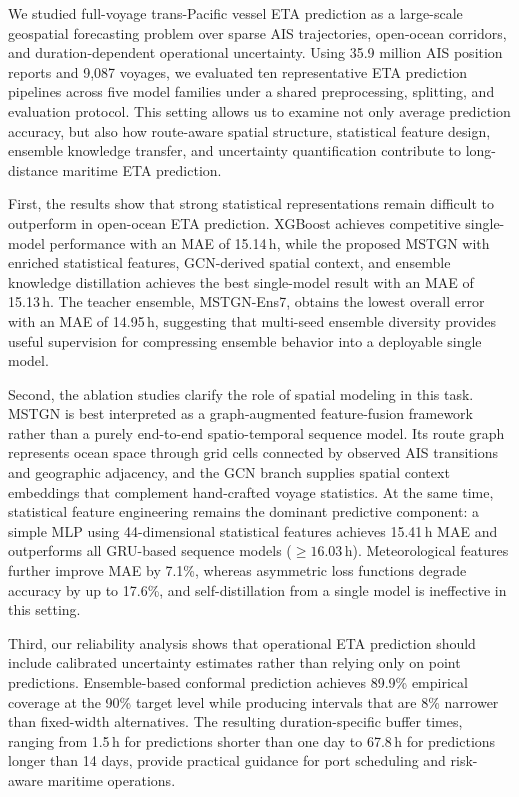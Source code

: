 \documentclass[sigconf,anonymous]{acmart}%
\begin{document}
We studied full-voyage trans-Pacific vessel ETA prediction as a large-scale geospatial forecasting problem over sparse AIS trajectories, open-ocean corridors, and duration-dependent operational uncertainty. Using 35.9 million AIS position reports and 9,087 voyages, we evaluated ten representative ETA prediction pipelines across five model families under a shared preprocessing, splitting, and evaluation protocol. This setting allows us to examine not only average prediction accuracy, but also how route-aware spatial structure, statistical feature design, ensemble knowledge transfer, and uncertainty quantification contribute to long-distance maritime ETA prediction.

First, the results show that strong statistical representations remain difficult to outperform in open-ocean ETA prediction. XGBoost achieves competitive single-model performance with an MAE of 15.14\,h, while the proposed MSTGN with enriched statistical features, GCN-derived spatial context, and ensemble knowledge distillation achieves the best single-model result with an MAE of 15.13\,h. The teacher ensemble, MSTGN-Ens7, obtains the lowest overall error with an MAE of 14.95\,h, suggesting that multi-seed ensemble diversity provides useful supervision for compressing ensemble behavior into a deployable single model.

Second, the ablation studies clarify the role of spatial modeling in this task. MSTGN is best interpreted as a graph-augmented feature-fusion framework rather than a purely end-to-end spatio-temporal sequence model. Its route graph represents ocean space through grid cells connected by observed AIS transitions and geographic adjacency, and the GCN branch supplies spatial context embeddings that complement hand-crafted voyage statistics. At the same time, statistical feature engineering remains the dominant predictive component: a simple MLP using 44-dimensional statistical features achieves 15.41\,h MAE and outperforms all GRU-based sequence models (${\geq}16.03$\,h). Meteorological features further improve MAE by 7.1\%, whereas asymmetric loss functions degrade accuracy by up to 17.6\%, and self-distillation from a single model is ineffective in this setting.

Third, our reliability analysis shows that operational ETA prediction should include calibrated uncertainty estimates rather than relying only on point predictions. Ensemble-based conformal prediction achieves 89.9\% empirical coverage at the 90\% target level while producing intervals that are 8\% narrower than fixed-width alternatives. The resulting duration-specific buffer times, ranging from 1.5\,h for predictions shorter than one day to 67.8\,h for predictions longer than 14 days, provide practical guidance for port scheduling and risk-aware maritime operations.
\end{document}
